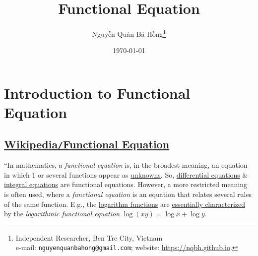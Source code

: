 \documentclass{article}
\title{Functional Equation}
\author{Nguyễn Quản Bá Hồng\footnote{Independent Researcher, Ben Tre City, Vietnam\\e-mail: \texttt{nguyenquanbahong@gmail.com}; website: \url{https://nqbh.github.io}.}}
\date{\today}
\numberwithin{equation}{section}
\begin{document}
\maketitle
\begin{abstract}
	
\end{abstract}
\setcounter{secnumdepth}{4}
\setcounter{tocdepth}{3}
\tableofcontents


\section{Introduction to Functional Equation}

\subsection{\href{https://en.wikipedia.org/wiki/Functional_equation}{Wikipedia\texttt{/}Functional Equation}}
``In mathematics, a \textit{functional equation} is, in the broadest meaning, an equation in which 1 or several functions appear as \href{https://en.wikipedia.org/wiki/Unknown_(mathematics)}{unknowns}. So, \href{https://en.wikipedia.org/wiki/Differential_equation}{differential equations} \& \href{https://en.wikipedia.org/wiki/Integral_equation}{integral equations} are functional equations. However, a more restricted meaning is often used, where a \textit{functional equation} is an equation that relates several rules of the same function. E.g., the \href{https://en.wikipedia.org/wiki/Logarithm_function}{logarithm functions} are \href{https://en.wikipedia.org/wiki/Logarithm#Characterization_by_the_product_formula}{essentially characterized} by the \textit{logarithmic functional equation} $\log(xy) = \log x + \log y$.
\end{document}
